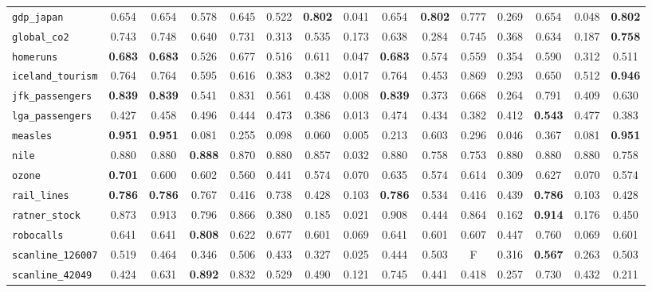 \begin{tabular}{lcccccccccccccc}
\verb+gdp_japan+ & 0.654 & 0.654 & 0.578 & 0.645 & 0.522 & \textbf{0.802} & 0.041 & 0.654 & \textbf{0.802} & 0.777 & 0.269 & 0.654 & 0.048 & \textbf{0.802}\\
\verb+global_co2+ & 0.743 & 0.748 & 0.640 & 0.731 & 0.313 & 0.535 & 0.173 & 0.638 & 0.284 & 0.745 & 0.368 & 0.634 & 0.187 & \textbf{0.758}\\
\verb+homeruns+ & \textbf{0.683} & \textbf{0.683} & 0.526 & 0.677 & 0.516 & 0.611 & 0.047 & \textbf{0.683} & 0.574 & 0.559 & 0.354 & 0.590 & 0.312 & 0.511\\
\verb+iceland_tourism+ & 0.764 & 0.764 & 0.595 & 0.616 & 0.383 & 0.382 & 0.017 & 0.764 & 0.453 & 0.869 & 0.293 & 0.650 & 0.512 & \textbf{0.946}\\
\verb+jfk_passengers+ & \textbf{0.839} & \textbf{0.839} & 0.541 & 0.831 & 0.561 & 0.438 & 0.008 & \textbf{0.839} & 0.373 & 0.668 & 0.264 & 0.791 & 0.409 & 0.630\\
\verb+lga_passengers+ & 0.427 & 0.458 & 0.496 & 0.444 & 0.473 & 0.386 & 0.013 & 0.474 & 0.434 & 0.382 & 0.412 & \textbf{0.543} & 0.477 & 0.383\\
\verb+measles+ & \textbf{0.951} & \textbf{0.951} & 0.081 & 0.255 & 0.098 & 0.060 & 0.005 & 0.213 & 0.603 & 0.296 & 0.046 & 0.367 & 0.081 & \textbf{0.951}\\
\verb+nile+ & 0.880 & 0.880 & \textbf{0.888} & 0.870 & 0.880 & 0.857 & 0.032 & 0.880 & 0.758 & 0.753 & 0.880 & 0.880 & 0.880 & 0.758\\
\verb+ozone+ & \textbf{0.701} & 0.600 & 0.602 & 0.560 & 0.441 & 0.574 & 0.070 & 0.635 & 0.574 & 0.614 & 0.309 & 0.627 & 0.070 & 0.574\\
\verb+rail_lines+ & \textbf{0.786} & \textbf{0.786} & 0.767 & 0.416 & 0.738 & 0.428 & 0.103 & \textbf{0.786} & 0.534 & 0.416 & 0.439 & \textbf{0.786} & 0.103 & 0.428\\
\verb+ratner_stock+ & 0.873 & 0.913 & 0.796 & 0.866 & 0.380 & 0.185 & 0.021 & 0.908 & 0.444 & 0.864 & 0.162 & \textbf{0.914} & 0.176 & 0.450\\
\verb+robocalls+ & 0.641 & 0.641 & \textbf{0.808} & 0.622 & 0.677 & 0.601 & 0.069 & 0.641 & 0.601 & 0.607 & 0.447 & 0.760 & 0.069 & 0.601\\
\verb+scanline_126007+ & 0.519 & 0.464 & 0.346 & 0.506 & 0.433 & 0.327 & 0.025 & 0.444 & 0.503 & F & 0.316 & \textbf{0.567} & 0.263 & 0.503\\
\verb+scanline_42049+ & 0.424 & 0.631 & \textbf{0.892} & 0.832 & 0.529 & 0.490 & 0.121 & 0.745 & 0.441 & 0.418 & 0.257 & 0.730 & 0.432 & 0.211\\

\end{tabular}

